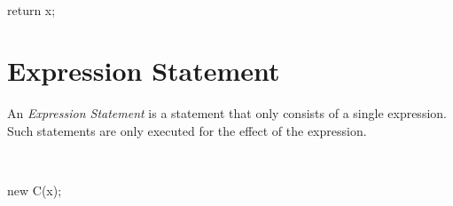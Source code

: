 \begin{abssyntax}
  {}\ \ \TRS{;}
\end{abssyntax}

\begin{absexample}
return x;
\end{absexample}

\section{Expression Statement}
An \emph{Expression Statement} is a statement that only consists of a single expression. Such statements are only executed for the effect of the expression.

\begin{abssyntax}
  {}\ \TRS{;}
\end{abssyntax}

\begin{absexample}
new C(x);
\end{absexample}
